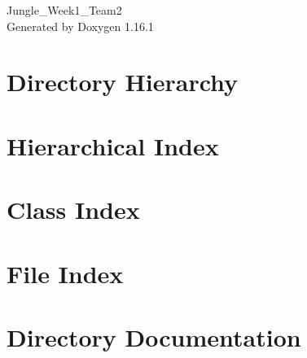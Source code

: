 \documentclass[twoside]{book}
\newcommand{\+}{\discretionary{\mbox{\scriptsize$\hookleftarrow$}}{}{}}
\newcommand{\clearemptydoublepage}{%
    \newpage{\pagestyle{empty}\cleardoublepage}%
  }
\begin{document}
  \raggedbottom
    \hypersetup{pageanchor=false,
                bookmarksnumbered=true,
                pdfencoding=unicode
               }
  \begin{titlepage}
  \vspace*{7cm}
  \begin{center}%
  {\Large Jungle\+\_\+\+Week1\+\_\+\+Team2}\\
  \vspace*{1cm}
  {\large Generated by Doxygen 1.16.1}\\
  \end{center}
  \end{titlepage}
  \clearemptydoublepage
  \tableofcontents
  \clearemptydoublepage
  \hypersetup{pageanchor=true}
\chapter{Directory Hierarchy}

\chapter{Hierarchical Index}

\chapter{Class Index}

\chapter{File Index}

\chapter{Directory Documentation}
























\end{document}
